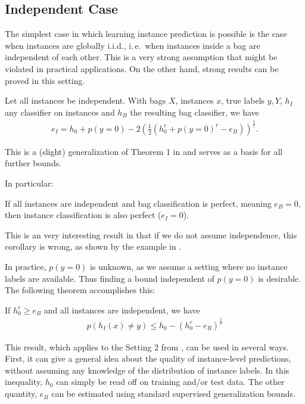 \subsection{Independent Case}
The simplest case in which learning instance prediction is possible is the case when instances are globally i.i.d.,
i.\,e.\ when instances inside a bag are independent of each other. This is a very strong assumption that might be
violated in practical applications. On the other hand, strong results can be proved in this setting.

\begin{theorem}\label{basicthm}
Let all instances be independent. With bags $X$, instances $x$, true labels $y,Y$, $h_I$ any classifier
on instances and $h_B$ the resulting bag classifier, we have
\begin{align*}
   e_I = h_0 + p(y=0) - 2 \left (\frac{1}{2} ( h_0^r + p(y=0)^r - e_B) \right)^\frac{1}{r}.
\end{align*}
\end{theorem}
This is a (slight) generalization of Theorem 1 in \citet{sabato2010reducing} and serves as a basis for all further bounds. 

In particular:
\begin{corollary}\label{perfect}
If all instances are independent and bag classification is perfect, meaning $e_B=0$, then instance classification is also perfect ($e_I =0$).
\end{corollary}
This is an very interesting result in that if we do not assume independence, this corollary is wrong,
as shown by the example in .

In practice, $p(y=0)$ is unknown, as we assume a setting where no instance labels are available.
Thus finding a bound independent of $p(y=0)$ is desirable. The following theorem accomplishes this:

\begin{theorem}\label{iidbound}
If $h_0^r  \geq e_B$ and all instances are independent, we have
\begin{align}
    p(h_I(x)\neq y) \leq h_0 - \left ( h_0^r - e_B \right ) ^ \frac{1}{r}
\end{align}
\end{theorem}

This result, which applies to the Setting $2$ from ,
can be used in several ways. First, it can give a general idea about the quality of instance-level
predictions, without assuming any knowledge of the distribution of instance labels. In this inequality,
$h_0$ can simply be read off on training and/or test data. The other quantity, $e_B$ can be
estimated using standard supervised generalization bounds.

